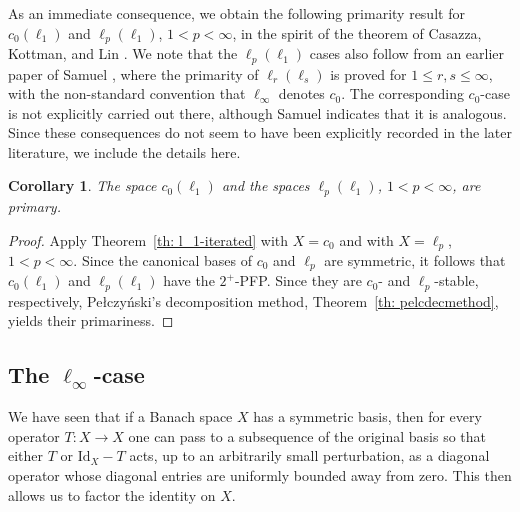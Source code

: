 \documentclass[11pt]{amsart}
\theoremstyle{plain}
\newtheorem{corollary}[theorem]{Corollary}
\theoremstyle{definition}
\numberwithin{equation}{section}
\newcommand{\Id}{\mathrm{Id}}
\renewcommand{\leq}{\leqslant}
\begin{document}
As an immediate consequence, we obtain the following primarity result for $c_0(\ell_1)$ and $\ell_p(\ell_1)$, $1<p<\infty$, in the spirit of the theorem of Casazza, Kottman, and Lin \cite{CKL1976}. We note that the $\ell_p(\ell_1)$ cases also follow from an earlier paper of Samuel \cite{Samuel1978}, where the primarity of $\ell_r(\ell_s)$ is proved for $1\leq r,s\leq\infty$, with the non-standard convention that $\ell_\infty$ denotes $c_0$. The corresponding $c_0$-case is not explicitly carried out there, although Samuel indicates that it is analogous. Since these consequences do not seem to have been explicitly recorded in the later literature, we include the details here.

\begin{corollary}
    The space $c_0(\ell_1)$ and the spaces $\ell_p(\ell_1)$, $1 < p < \infty$, are primary.
\end{corollary}

\begin{proof}
    Apply Theorem~\ref{th: l_1-iterated} with $X=c_0$ and with $X=\ell_p$, $1 < p < \infty$. Since the canonical bases of $c_0$ and $\ell_p$ are symmetric, it follows that $c_0(\ell_1)$ and $\ell_p(\ell_1)$ have the $2^+$-PFP. Since they are $c_0$- and $\ell_p$-stable, respectively, Pe\l czy\'nski's decomposition method, Theorem~\ref{th: pelcdecmethod}, yields their primariness.
\end{proof}




\subsection{The \texorpdfstring{$\ell_\infty$}{l-infinity}-case}  \label{sec: l_infty-case-separable} 

We have seen that if a Banach space $X$ has a symmetric basis, then for every operator $T \colon X \to X$ one can pass to a subsequence of the original basis so that either $T$ or $\Id_X - T$ acts, up to an arbitrarily small perturbation, as a diagonal operator whose diagonal entries are uniformly bounded away from zero. This then allows us to factor the identity on $X$.
\end{document}
